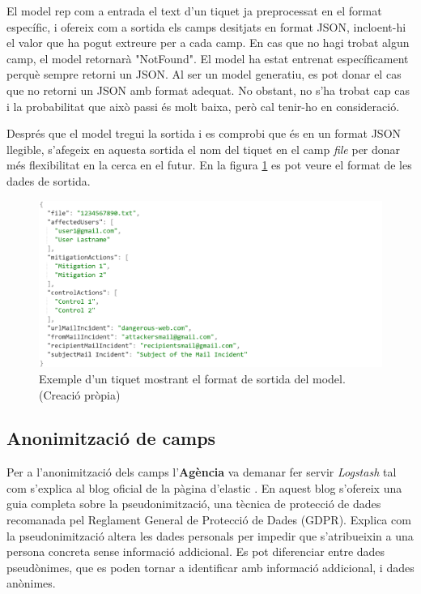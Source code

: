 El model rep com a entrada el text d'un tiquet ja preprocessat en el format específic, i ofereix com a sortida els camps desitjats en format JSON, incloent-hi el valor que ha pogut extreure per a cada camp. En cas que no hagi trobat algun camp, el model retornarà "NotFound". El model ha estat entrenat específicament perquè sempre retorni un JSON. Al ser un model generatiu, es pot donar el cas que no retorni un JSON amb format adequat. No obstant, no s'ha trobat cap cas i la probabilitat que això passi és molt baixa, però cal tenir-ho en consideració. 

Després que el model tregui la sortida i es comprobi que és en un format JSON llegible, s'afegeix en aquesta sortida el nom del tiquet en el camp \textit{file} per donar més flexibilitat en la cerca en el futur. En la figura \ref{fig:format-sortida-dades} es pot veure el format de les dades de sortida.

\begin{figure}[H]
     \centering
     \includegraphics[width=\textwidth]{format_sortida_dades.png}
     \caption[Format de sortida del model]{Exemple d'un tiquet mostrant el format de sortida del model. \\ (Creació pròpia)}
     \label{fig:format-sortida-dades}
 \end{figure}

\subsection{Anonimització de camps}
Per a l'anonimització dels camps l'\textbf{Agència} va demanar fer servir \textit{Logstash} tal com s'explica al blog oficial de la pàgina d'elastic \cite{Logstash}. En aquest blog s'ofereix una guia completa sobre la pseudonimització, una tècnica de protecció de dades recomanada pel Reglament General de Protecció de Dades (GDPR). Explica com la pseudonimització altera les dades personals per impedir que s'atribueixin a una persona concreta sense informació addicional. Es pot diferenciar entre dades pseudònimes, que es poden tornar a identificar amb informació addicional, i dades anònimes.

